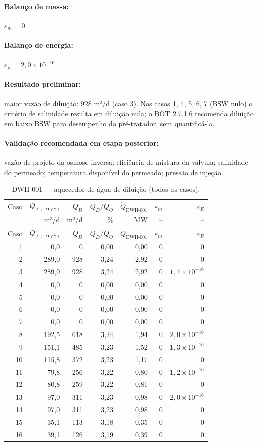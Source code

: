 \documentclass[11pt,a4paper]{article}
\numberwithin{equation}{section}
\numberwithin{table}{section}
\numberwithin{figure}{section}
\begin{document}
\paragraph{Balanço de massa:} $\varepsilon_m=$$0$.
\paragraph{Balanço de energia:} $\varepsilon_E=$$2{,}0\times10^{-16}$.
\paragraph{Resultado preliminar:} maior vazão de diluição: 928 m³/d (caso 3). Nos casos 1, 4, 5, 6, 7 (BSW nulo) o critério de salinidade resulta em diluição nula; o BOT 2.7.1.6 recomenda diluição em baixo BSW para desempenho do pré-tratador, sem quantificá-la.
\paragraph{Validação recomendada em etapa posterior:} vazão de projeto da osmose inversa; eficiência de mistura da válvula; salinidade do permeado; temperatura disponível do permeado; pressão de injeção.
{\footnotesize\setlength{\tabcolsep}{3.5pt}\begin{longtable}{rrrrrrr}
\caption{DWH-001 --- aquecedor de água de diluição (todos os casos).\label{tab:b08}}\\\toprule
Caso & $Q_{A+D,C11}$ & $Q_D$ & $Q_D/Q_O$ & $\dot Q_{\mbox{DWH-001}}$ & $\varepsilon_m$ & $\varepsilon_E$\\
 & m³/d & m³/d & \% & MW & -- & --\\\midrule\endfirsthead
\toprule Caso & $Q_{A+D,C11}$ & $Q_D$ & $Q_D/Q_O$ & $\dot Q_{\mbox{DWH-001}}$ & $\varepsilon_m$ & $\varepsilon_E$\\\midrule\endhead
1 & 0,0 & 0 & 0,00 & 0,00 & $0$ & $0$\\
2 & 289,0 & 928 & 3,24 & 2,92 & $0$ & $0$\\
3 & 289,0 & 928 & 3,24 & 2,92 & $0$ & $1{,}4\times10^{-16}$\\
4 & 0,0 & 0 & 0,00 & 0,00 & $0$ & $0$\\
5 & 0,0 & 0 & 0,00 & 0,00 & $0$ & $0$\\
6 & 0,0 & 0 & 0,00 & 0,00 & $0$ & $0$\\
7 & 0,0 & 0 & 0,00 & 0,00 & $0$ & $0$\\
8 & 192,5 & 618 & 3,24 & 1,94 & $0$ & $2{,}0\times10^{-16}$\\
9 & 151,1 & 485 & 3,23 & 1,52 & $0$ & $1{,}3\times10^{-16}$\\
10 & 115,8 & 372 & 3,23 & 1,17 & $0$ & $0$\\
11 & 79,8 & 256 & 3,22 & 0,80 & $0$ & $1{,}2\times10^{-16}$\\
12 & 80,8 & 259 & 3,22 & 0,81 & $0$ & $0$\\
13 & 97,0 & 311 & 3,23 & 0,98 & $0$ & $2{,}0\times10^{-16}$\\
14 & 97,0 & 311 & 3,23 & 0,98 & $0$ & $0$\\
15 & 35,1 & 113 & 3,18 & 0,35 & $0$ & $0$\\
16 & 39,1 & 126 & 3,19 & 0,39 & $0$ & $0$\\
\bottomrule\end{longtable}}
\end{document}
